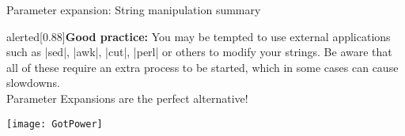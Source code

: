 \begin{frame}{Parameter expansion: String manipulation summary}
    \vspace{-3mm}
    \begin{varblock}{alerted}[0.88\textwidth]{\textbf{Good practice:}}
        You may be tempted to use external applications such as \bash|sed|, \bash|awk|, \bash|cut|, \bash|perl| or others to modify your strings.
        Be aware that all of these require an extra process to be started, which in some cases can cause slowdowns.\\
        \alert{Parameter Expansions are the perfect alternative!}
    \end{varblock}
    \bigskip
    \centerline{\texttt{[image: GotPower]}}
\end{frame}
